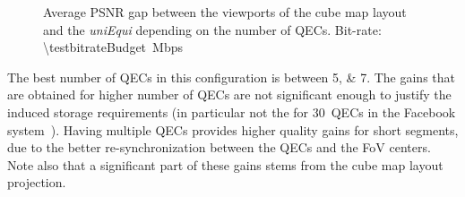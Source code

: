 \begin{figure}[htbp]
\centering

\caption{Average \acs{PSNR} gap between the viewports of the cube map layout and the \textit{uniEqui} depending
on the number of QECs.
Bit-rate: \SI{\testbitrateBudget}{\mega bps}}
\label{fig:QEC}
\end{figure}

The best number of \acp{QEC} in this configuration is between
\numlist{5;7}. The gains that are obtained for higher number of
\acp{QEC} are not significant enough to justify the induced storage
requirements (in particular not the for $30$~\acp{QEC} in the Facebook
system~\cite{facebook}). Having multiple  \acp{QEC} provides higher
quality gains for short segments, due to the better re-synchronization
between the \acp{QEC} and the \ac{FoV} centers. Note also that a
significant part of these gains stems from the cube map layout
projection.
%
